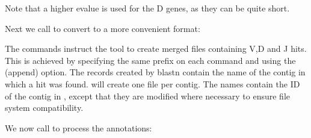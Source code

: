 \documentclass[letterpaper,10pt,english]{sphinxmanual}
\begin{document}
\sphinxAtStartPar
Note that a higher evalue is used for the D genes, as they can be quite short.

\sphinxAtStartPar
Next we call  to convert to a more convenient format:

\begin{sphinxVerbatim}[commandchars=\\\{\}]
   
    
    
\end{sphinxVerbatim}

\sphinxAtStartPar
The commands instruct the tool to create merged files containing V,D and J hits. This is achieved by specifying the same prefix on each command  and using the  (append) option.
The records created by blastn contain the name of the contig in which a hit was found.  will create one file per contig. The names contain the ID of the contig in
, except that they are modified where necessary to ensure file system compatibility.

\sphinxAtStartPar
We now call  to process the annotations:

\begin{sphinxVerbatim}[commandchars=\\\{\}]
   \PYGZbs{}
        \PYGZbs{}
        \PYGZbs{}
         \PYGZbs{}
         \PYGZbs{}
         \PYGZbs{}
\end{sphinxVerbatim}
\end{document}

